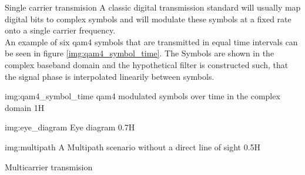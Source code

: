 \begin{subchapter}{Single carrier transmision}
  A classic digital transmission standard will usually map
  digital bits to complex symbols and will modulate these
  symbols at a fixed rate onto a single carrier frequency. \\

  An example of six \acrshort{qam4} symbols that are transmitted
  in equal time intervals can be seen in figure \ref{img:qam4_symbol_time}.
  The Symbols are shown in the complex baseband domain and the
  hypothetical filter is constructed such, that the signal
  phase is interpolated linearily between symbols.

               {img:qam4_symbol_time}
               {\acrshort{qam4} modulated symbols over time in the complex domain}
               {1}{H}

                  {img:eye_diagram}
                  {Eye diagram}
                  {0.7}{H}

               {img:multipath}
               {A Multipath scenario without a direct line of sight}
               {0.5}{H}

\end{subchapter}

\begin{subchapter}{Multicarrier transmision}

\end{subchapter}

